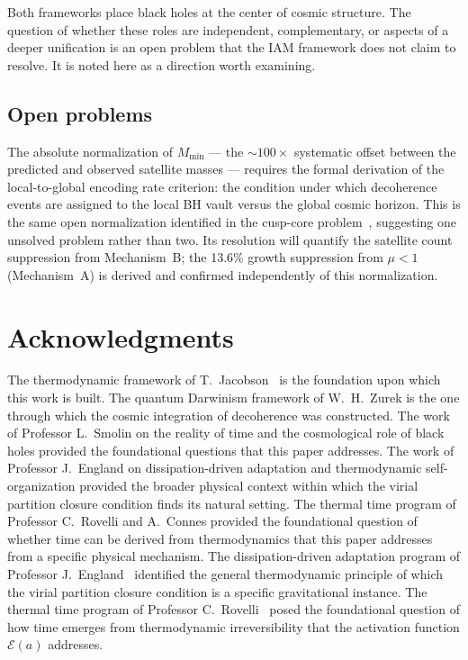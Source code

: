 \documentclass[12pt,a4paper]{article}
\begin{document}
Both frameworks place black holes at the center of cosmic structure.
The question of whether these roles are independent, complementary, or
aspects of a deeper unification is an open problem that the IAM framework
does not claim to resolve. It is noted here as a direction worth examining.

\subsection{Open problems}

The absolute normalization of $M_\mathrm{min}$ --- the $\sim 100\times$
systematic offset between the predicted and observed satellite masses ---
requires the formal derivation of the local-to-global encoding rate
criterion: the condition under which decoherence events are assigned to
the local BH vault versus the global cosmic horizon. This is the same
open normalization identified in the cusp-core problem~\citep{IAM_small_scale},
suggesting one unsolved problem rather than two. Its resolution will
quantify the satellite count suppression from Mechanism~B; the 13.6\%
growth suppression from $\mu < 1$ (Mechanism~A) is derived and confirmed
independently of this normalization.

\section*{Acknowledgments}

The thermodynamic framework of T.\ Jacobson~\citep{Jacobson1995} is
the foundation upon which this work is built. The quantum Darwinism framework of W.\ H.\ Zurek is the one through which
the cosmic integration of decoherence was constructed.
The work of Professor L.\ Smolin on the reality of time and the
cosmological role of black holes provided the foundational questions that
this paper addresses. The work of Professor J.\ England on dissipation-driven
adaptation and thermodynamic self-organization provided the broader physical
context within which the virial partition closure condition finds its
natural setting. The thermal time program of Professor C.\ Rovelli and
A.\ Connes provided the foundational question of whether time can be derived
from thermodynamics that this paper addresses from a specific physical
mechanism. The dissipation-driven adaptation program of
Professor J.\ England~\citep{England2013,England2015} identified the
general thermodynamic principle of which the virial partition closure
condition is a specific gravitational instance. The thermal time program
of Professor C.\ Rovelli~\citep{Rovelli1993,Connes1994} posed the
foundational question of how time emerges from thermodynamic irreversibility
that the activation function $\mathcal{E}(a)$ addresses.
\end{document}
